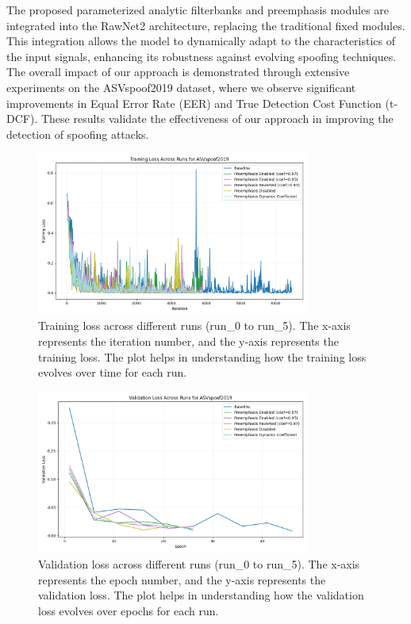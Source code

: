 \documentclass{article} %
\begin{document}
The proposed parameterized analytic filterbanks and preemphasis modules are integrated into the RawNet2 architecture, replacing the traditional fixed modules. This integration allows the model to dynamically adapt to the characteristics of the input signals, enhancing its robustness against evolving spoofing techniques. The overall impact of our approach is demonstrated through extensive experiments on the ASVspoof2019 dataset, where we observe significant improvements in Equal Error Rate (EER) and True Detection Cost Function (t-DCF). These results validate the effectiveness of our approach in improving the detection of spoofing attacks.

\begin{figure}[h]
    \centering
    \includegraphics[width=0.8\textwidth]{train_loss_ASVspoof2019_across_runs.png}
    \caption{Training loss across different runs (run\_0 to run\_5). The x-axis represents the iteration number, and the y-axis represents the training loss. The plot helps in understanding how the training loss evolves over time for each run.}
    \label{fig:train_loss}
\end{figure}

\begin{figure}[h]
    \centering
    \includegraphics[width=0.8\textwidth]{val_loss_ASVspoof2019_across_runs.png}
    \caption{Validation loss across different runs (run\_0 to run\_5). The x-axis represents the epoch number, and the y-axis represents the validation loss. The plot helps in understanding how the validation loss evolves over epochs for each run.}
    \label{fig:val_loss}
\end{figure}
\end{document}
